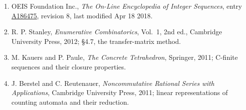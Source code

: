 \documentclass[11pt]{article}
\theoremstyle{definition}
\begin{document}
\begin{enumerate}

\item OEIS Foundation Inc., \emph{The On-Line Encyclopedia of Integer Sequences}, entry \href{https://oeis.org/A186475}{A186475}, revision 8, last modified Apr 18 2018.

\item R. P. Stanley, \emph{Enumerative Combinatorics}, Vol.~1, 2nd ed., Cambridge University Press, 2012; \S4.7, the transfer-matrix method.

\item M. Kauers and P. Paule, \emph{The Concrete Tetrahedron}, Springer, 2011; C-finite sequences and their closure properties.

\item J. Berstel and C. Reutenauer, \emph{Noncommutative Rational Series with Applications}, Cambridge University Press, 2011; linear representations of counting automata and their reduction.

\end{enumerate}
\end{document}
